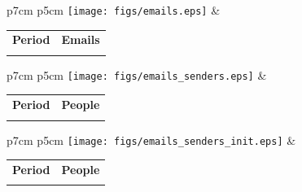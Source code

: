\documentclass[a4wide,11pt]{report}
\begin{document}
\begin{tabular}{p{7cm} p{5cm}}
    \vspace{0pt} 
    \texttt{[image: figs/emails.eps]}
    & 
    \vspace{0pt}
    \begin{tabular}{l|l}%
    \bfseries Period & \bfseries Emails %
    \csvreader[head to column names]{data/emails.csv}{}%
    {\\ & \emails}
    \end{tabular}
\end{tabular}

\begin{tabular}{p{7cm} p{5cm}}
    \vspace{0pt} 
    \texttt{[image: figs/emails\_senders.eps]}
    & 
    \vspace{0pt}
    \begin{tabular}{l|l}%
    \bfseries Period & \bfseries People %
    \csvreader[head to column names]{data/emails_senders.csv}{}%
    {\\ & \senders}
    \end{tabular}
\end{tabular}

\begin{tabular}{p{7cm} p{5cm}}
    \vspace{0pt} 
    \texttt{[image: figs/emails\_senders\_init.eps]}
    & 
    \vspace{0pt}
    \begin{tabular}{l|l}%
    \bfseries Period & \bfseries People %
    \csvreader[head to column names]{data/emails_senders_init.csv}{}%
    {\\ & \senders}
    \end{tabular}
\end{tabular}

\end{document}
